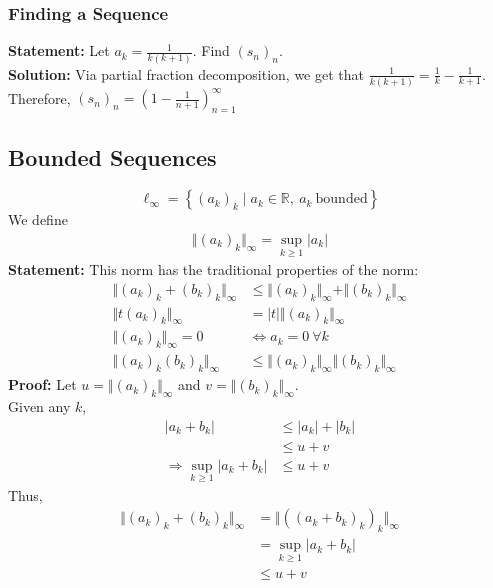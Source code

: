 \documentclass[10pt]{extarticle}
\newcommand{\R}{\mathbb{R}}
\begin{document}
        \subsubsection{Finding a Sequence}%
        \textbf{Statement:} Let $a_k = \frac{1}{k(k+1)}$. Find $(s_n)_n$.\\

        \textbf{Solution:} Via partial fraction decomposition, we get that $\frac{1}{k(k+1)} = \frac{1}{k}-\frac{1}{k+1}$. Therefore, $(s_n)_n = \left(1-\frac{1}{n+1}\right)_{n=1}^{\infty}$
    \subsection{Bounded Sequences}%
    \[
      \ell_{\infty} = \left\{(a_k)_k \mid a_k\in\R,~a_k~\text{bounded}\right\}
    \] 
    We define
    \begin{align*}
      \Vert(a_k)_k\Vert_{\infty} = \sup_{k\geq 1}|a_k|\tag*{Infinity Norm}
    \end{align*}
    \textbf{Statement:} This norm has the traditional properties of the norm:
    \begin{align*}
      \Vert (a_k)_k + (b_k)_k\Vert_{\infty} &\leq \Vert(a_k)_k\Vert_{\infty} + \Vert(b_k)_k\Vert_{\infty}\tag*{Triangle Inequality}\\
      \Vert t(a_k)_k\Vert_{\infty} &= |t|\Vert(a_k)_k\Vert_{\infty}\tag*{Scalar Multiplication}\\
      \Vert(a_k)_k\Vert_{\infty} = 0 &\Leftrightarrow a_k = 0~\forall k\tag*{Zero Property}\\
      \Vert(a_k)_k(b_k)_k\Vert_{\infty} &\leq \Vert(a_k)_k\Vert_{\infty}\Vert(b_k)_k\Vert_{\infty}\tag*{Multiplication}
    \end{align*}
    \textbf{Proof:} Let $u = \Vert(a_k)_k\Vert_{\infty}$ and $v = \Vert(b_k)_k\Vert_{\infty}$.\\

      Given any $k$,
      \begin{align*}
        |a_k + b_k| &\leq |a_k| + |b_k| \tag*{Triangle Inequality on $|\cdot|$}\\
                    &\leq u+v \tag*{definition of supremum}\\
        \Rightarrow \sup_{k\geq 1}|a_k + b_k|&\leq u+v
      \end{align*}
      Thus,
      \begin{align*}
        \Vert (a_k)_k + (b_k)_k\Vert_{\infty} &= \Vert \left((a_k + b_k)_k\right)_k\Vert_{\infty}\\
                                              &= \sup_{k\geq 1}|a_k + b_k|\\
                                              &\leq u+v
      \end{align*}
\end{document}
